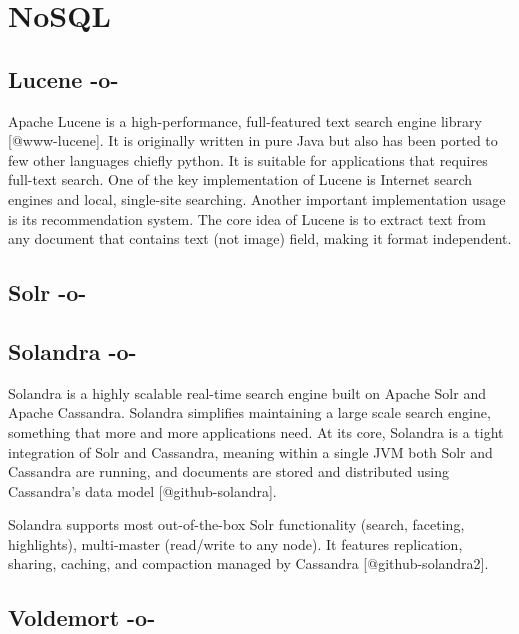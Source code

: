 \section{NoSQL}

\subsection{Lucene -o-}

Apache Lucene is a high-performance, full-featured text search engine
library [@www-lucene].  It is originally written in pure Java but
also has been ported to few other languages chiefly python.  It is
suitable for applications that requires full-text search.  One of the
key implementation of Lucene is Internet search engines and local,
single-site searching.  Another important implementation usage is its
recommendation system. The core idea of Lucene is to extract text from
any document that contains text (not image) field, making it format
independent.



\subsection{Solr -o-}



\subsection{Solandra -o-}
     
Solandra is a highly scalable real-time search engine built on Apache
Solr and Apache Cassandra. Solandra simplifies maintaining a large
scale search engine, something that more and more applications
need. At its core, Solandra is a tight integration of Solr and
Cassandra, meaning within a single JVM both Solr and Cassandra are
running, and documents are stored and distributed using Cassandra's
data model [@github-solandra].

Solandra supports most out-of-the-box Solr functionality (search,
faceting, highlights), multi-master (read/write to any node). It
features replication, sharing, caching, and compaction managed by
Cassandra [@github-solandra2].


    
\subsection{Voldemort -o-}

